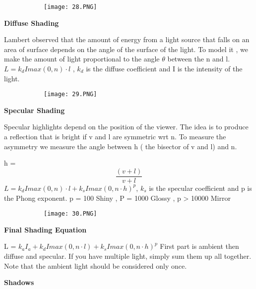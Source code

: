 \documentclass{article}
\begin{document}
\begin{figure}[ht!]
  \centering
  \begin{subfigure}[b]{0.3\linewidth}
    \texttt{[image: 28.PNG]}
  \end{subfigure}
\end{figure}

\vspace{3mm}
\textbf{Diffuse Shading}

Lambert observed that the amount of energy from a light source that falls on an area of surface depends on the angle of the surface of the light.
To model it , we make the amount of light proportional to the angle $\theta$ between the n and l.
$L = k_d I max(0,n)\cdot l$ , $k_d$ is the diffuse coefficient and I is the intensity of the light.

\begin{figure}[ht!]
  \centering
  \begin{subfigure}[b]{0.3\linewidth}
    \texttt{[image: 29.PNG]}
  \end{subfigure}
\end{figure}


\vspace{3mm}
\textbf{Specular Shading}

Specular highlights depend on the position of the viewer.
The idea is to produce a reflection that is bright if v and l are symmetric wrt n. To measure the asymmetry we measure the angle between h ( the bisector of v and l) and n.

h = \[\frac{(v+l)}{v+l}\]
$L = k_d I max(0,n)\cdot l + k_s I max(0,n \cdot h)^p$, $k_s$ is the specular coefficient and p is the Phong exponent. p = 100 Shiny , P = 1000 Glossy , p > 10000 Mirror

\begin{figure}[ht!]
  \centering
  \begin{subfigure}[b]{0.3\linewidth}
    \texttt{[image: 30.PNG]}
  \end{subfigure}
\end{figure}

\vspace{3mm}
\textbf{Final Shading Equation}

L  = $k_a I_a + k_d I max(0,n \cdot l) + k_s I max(0,n \cdot h)^p$
First part is ambient then diffuse and specular.
If you have multiple light, simply sum them up all together. Note that the ambient light should be considered only once.

\vspace{3mm}
\textbf{Shadows}
\end{document}
